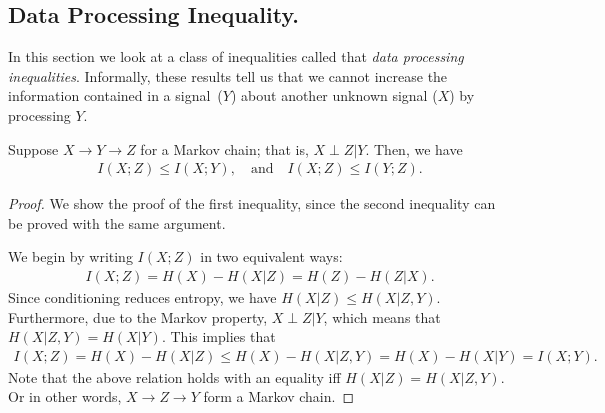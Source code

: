             
            \subsection{Data Processing Inequality.}
                In this section we look at a class of inequalities called that \emph{data processing inequalities}. Informally, these results tell us that we cannot increase the information contained in a  signal~($Y$)  about another unknown signal ($X$) by processing $Y$. 
                \begin{theorem}
                    \label{thm:dpi-mi}
                    Suppose $X \rightarrow Y \rightarrow Z$ for a Markov chain; that is, $X \perp Z | Y$. Then, we have 
                    \begin{align}
                        I(X; Z) \leq I(X; Y), \quad \text{and} \quad I(X; Z) \leq I(Y;Z). 
                    \end{align}
                \end{theorem}  
                \begin{proof}
                    We show the proof of the first inequality, since the second inequality can be proved with the same argument. 

                    We begin by writing $I(X;Z)$ in two equivalent ways: 
                    \begin{align}
                        I(X; Z) = H(X) - H(X|Z) = H(Z) - H(Z|X). 
                    \end{align}
                    Since conditioning reduces entropy, we have $H(X|Z) \leq H(X|Z, Y)$. Furthermore, due to the Markov property, $X \perp Z|Y$, which means that $H(X|Z, Y) = H(X|Y)$. This implies that 
                    \begin{align}
                        I(X;Z) = H(X) - H(X|Z) \leq H(X) - H(X|Z, Y) = H(X) - H(X|Y) = I(X; Y). 
                    \end{align}
                    Note that the above relation holds with an equality iff $H(X|Z) = H(X|Z, Y)$. Or in other words, $X \rightarrow Z \rightarrow Y$ form a Markov chain. 
                \end{proof}
